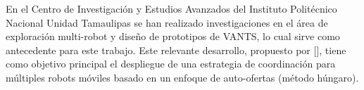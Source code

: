 
En el Centro de Investigaci\'{o}n y Estudios Avanzados del Instituto Polit\'{e}cnico Nacional Unidad Tamaulipas se han realizado investigaciones en el \'{a}rea de exploraci\'{o}n multi-robot y dise\~{n}o de prototipos de VANTS, lo cual sirve como antecedente para este trabajo. Este relevante desarrollo, propuesto por \citeauthor{CINVESTAM2013}[], tiene como objetivo principal el despliegue de una estrategia de coordinaci\'{o}n para m\'{u}ltiples robots m\'{o}viles basado en un enfoque de auto-ofertas (método húngaro).

\newpage

